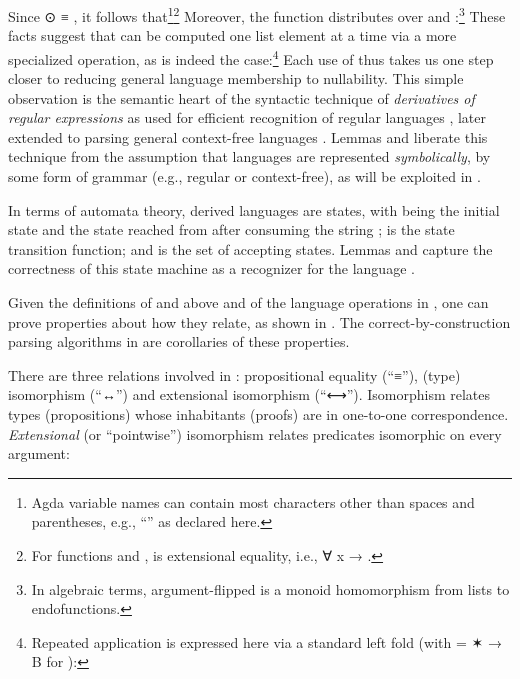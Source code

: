 \documentclass[acmsmall,screen,timestamp,anonymous,review]{acmart}
\begin{document}
Since { \AF ⊙ \AIC{[]} \AD ≡ }, it follows that\footnote{Agda variable names can contain most characters other than spaces and parentheses, e.g., ``'' as declared here.}\footnote{For functions  and , {  } is extensional equality, i.e., {\AS ∀ \AB x \AS →     }.}
Moreover, the function  distributes over \AIC{[]} and :\footnote{In algebraic terms, argument-flipped  is a monoid homomorphism from lists to endofunctions.}
These facts suggest that  can be computed one list element at a time via a more specialized operation, as is indeed the case:\footnote{Repeated  application is expressed here via a standard left fold (with { \AS =  \AF ✶ \AS → \AB B} for ):
}
Each use of  thus takes us one step closer to reducing general language membership to nullability.
This simple observation is the semantic heart of the syntactic technique of \emph{derivatives of regular expressions} as used for efficient recognition of regular languages \citep{Brzozowski64}, later extended to parsing general context-free languages \citep{Might2010YaccID}.
Lemmas  and  liberate this technique from the assumption that languages are represented \emph{symbolically}, by some form of grammar (e.g., regular or context-free), as will be exploited in .

In terms of automata theory, derived languages are states, with  being the initial state and {  } the state reached from  after consuming the string ;  is the state transition function; and  is the set of accepting states\out{ \needcite{}}.
Lemmas  and  capture the correctness of this state machine as a recognizer for the language .

Given the definitions of  and  above and of the language operations in , one can prove properties about how they relate, as shown in
.
The correct-by-construction parsing algorithms in  are corollaries of these properties.

There are three relations involved in : propositional equality (``≡''), (type) isomorphism (``↔'') and extensional isomorphism (``⟷'').
Isomorphism relates types (propositions) whose inhabitants (proofs) are in one-to-one correspondence.
\emph{Extensional} (or ``pointwise'') isomorphism relates predicates isomorphic on every argument:
\end{document}
